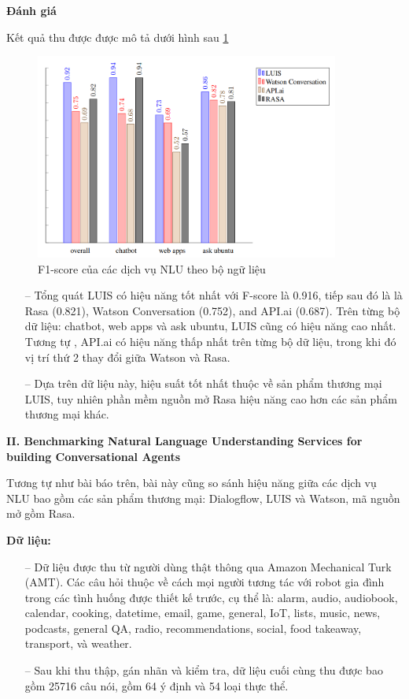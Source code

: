 \textbf{Đánh giá}

Kết quả thu được được mô tả dưới hình sau \ref{fig:comparisonimg-FscoresNLUServices}

\begin{figure}[H]
    \centering
    \includegraphics[width=10cm]{images/comparisonimg/FscoresNLUServices.png}
    \caption{F1-score của các dịch vụ NLU theo bộ ngữ liệu}
    \label{fig:comparisonimg-FscoresNLUServices}
\end{figure}

\begin{itemize}
    \item[--] Tổng quát LUIS có hiệu năng tốt nhất với F-score là 0.916, tiếp sau đó là là Rasa (0.821), Watson Conversation (0.752), and API.ai (0.687). Trên từng bộ dữ liệu: chatbot, web apps và ask ubuntu, LUIS cũng có hiệu năng cao nhất. Tương tự , API.ai có hiệu năng thấp nhất trên từng bộ dữ liệu, trong khi đó vị trí thứ 2 thay đổi giữa Watson và Rasa.
    \item[--] Dựa trên dữ liệu này, hiệu suất tốt nhất thuộc về sản phẩm thương mại LUIS, tuy nhiên phần mềm nguồn mở Rasa hiệu năng cao hơn các sản phẩm thương mại khác.
\end{itemize}

\textbf{II. Benchmarking Natural Language Understanding Services for building Conversational Agents}

Tương tự như bài báo trên, bài này cũng so sánh hiệu năng giữa các dịch vụ NLU bao gồm các sản phẩm thương mại: Dialogflow, LUIS và Watson, mã nguồn mở gồm Rasa.

\textbf{Dữ liệu: }

\begin{itemize}
    \item[--] Dữ liệu được thu từ người dùng thật thông qua Amazon Mechanical Turk (AMT). Các câu hỏi thuộc về cách mọi người tương tác với robot gia đình trong các tình huống được thiết kế trước, cụ thể là: alarm, audio, audiobook, calendar, cooking, datetime, email, game, general, IoT, lists, music, news, podcasts, general QA, radio, recommendations, social, food takeaway, transport, và weather.
    \item[--] Sau khi thu thập, gán nhãn và kiểm tra, dữ liệu cuối cùng thu được bao gồm 25716 câu nói, gồm 64 ý định và 54 loại thực thể.
\end{itemize}

